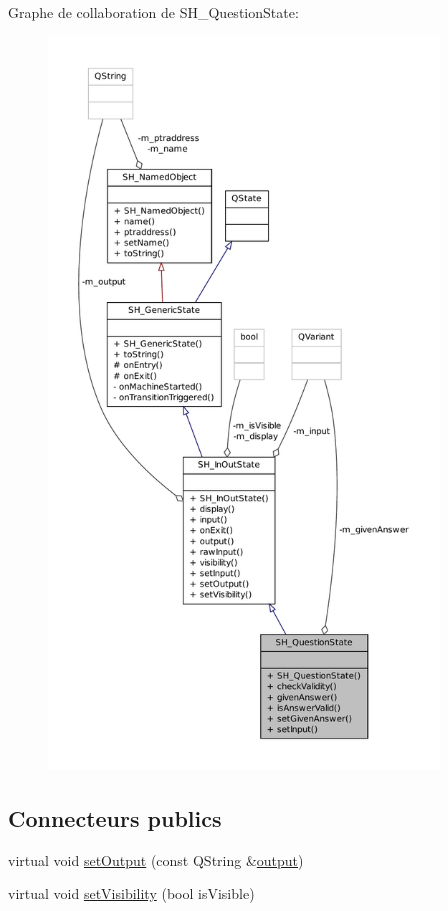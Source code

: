 Graphe de collaboration de S\-H\-\_\-\-Question\-State\-:\nopagebreak
\begin{figure}[H]
\begin{center}
\leavevmode
\includegraphics[height=550pt]{classSH__QuestionState__coll__graph}
\end{center}
\end{figure}
\subsection*{Connecteurs publics}
\begin{DoxyCompactItemize}
\item 
virtual void \hyperlink{classSH__InOutState_a7dc244d72e09fdbc30eb3a704b05a4d8}{set\-Output} (const Q\-String \&\hyperlink{classSH__InOutState_a1a2fd4f34484125058e20730aaee7e46}{output})
\item 
virtual void \hyperlink{classSH__InOutState_a7706a2ea1367ab3416db27fa0f4794f7}{set\-Visibility} (bool is\-Visible)
\end{DoxyCompactItemize}
